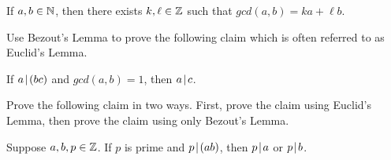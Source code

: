 \begin{lemma}  If $a,b \in \mathbb{N}$, then there exists $k, \ell \in \mathbb{Z}$ such that $gcd(a,b)=ka+\ell b$.
\end{lemma}
\newpage
\begin{question}[resume]
\item Use Bezout's Lemma to prove the following claim which is often referred to as Euclid's Lemma.
\end{question}

\begin{claim}  If $a \! \mid \! (bc)$ and $gcd(a,b)=1$, then $a \! \mid \! c$.
\end{claim}

\vspace{3in}

\begin{question}[resume]
\item Prove the following claim in two ways.  First, prove the claim using Euclid's Lemma, then prove the claim using only Bezout's Lemma.
\end{question}

\begin{claim}  Suppose $a,b,p \in \mathbb{Z}$.  If $p$ is prime and $p \! \mid \! (ab)$, then $p \! \mid \! a$ or $p \! \mid \! b$.
\end{claim}





